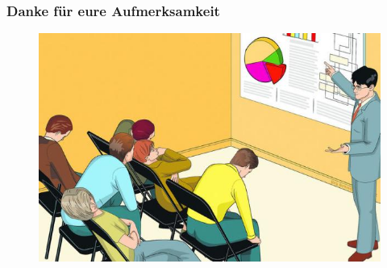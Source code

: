 \documentclass{beamer}
\begin{document}

    \begin{frame}
        \frametitle{Danke für eure Aufmerksamkeit}
        \begin{figure}
            \centering
            \includegraphics[width=.7\textwidth]{Vortragende.jpg}
        \end{figure}
    \end{frame}
\end{document}
